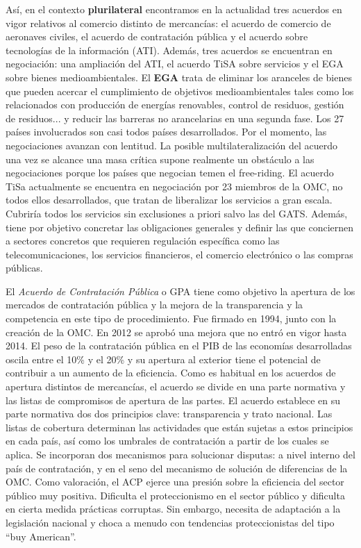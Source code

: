 \documentclass{nuevotema}
\begin{document}
Así, en el contexto \textbf{plurilateral} encontramos en la actualidad tres acuerdos en vigor relativos al comercio distinto de mercancías: el acuerdo de comercio de aeronaves civiles, el acuerdo de contratación pública y el acuerdo sobre tecnologías de la información (ATI). Además, tres acuerdos se encuentran en negociación: una ampliación del ATI, el acuerdo TiSA sobre servicios y el EGA sobre bienes medioambientales. El \textbf{EGA} trata de eliminar los aranceles de bienes que pueden acercar el cumplimiento de objetivos medioambientales tales como los relacionados con producción de energías renovables, control de residuos, gestión de residuos... y reducir las barreras no arancelarias en una segunda fase. Los 27 países involucrados son casi todos países desarrollados. Por el momento, las negociaciones avanzan con lentitud. La posible multilateralización del acuerdo una vez se alcance una masa crítica supone realmente un obstáculo a las negociaciones porque los países que negocian temen el free-riding. El acuerdo TiSa actualmente se encuentra en negociación por 23 miembros de la OMC, no todos ellos desarrollados, que tratan de liberalizar los servicios a gran escala. Cubriría todos los servicios sin exclusiones a priori salvo las del GATS. Además, tiene por objetivo concretar las obligaciones generales y definir las que conciernen a sectores concretos que requieren regulación específica como las telecomunicaciones, los servicios financieros, el comercio electrónico o las compras públicas. 

El \textit{Acuerdo de Contratación Pública} o GPA tiene como objetivo la apertura de los mercados de contratación pública y la mejora de la transparencia y la competencia en este tipo de procedimiento. Fue firmado en 1994, junto con la creación de la OMC. En 2012 se aprobó una mejora que no entró en vigor hasta 2014. El peso de la contratación pública en el PIB de las economías desarrolladas oscila entre el 10\% y el 20\% y su apertura al exterior tiene el potencial de contribuir a un aumento de la eficiencia. Como es habitual en los acuerdos de apertura distintos de mercancías, el acuerdo se divide en una parte normativa y las listas de compromisos de apertura de las partes. El acuerdo establece en su parte normativa dos dos principios clave: transparencia y trato nacional. Las listas de cobertura determinan las actividades que están sujetas a estos principios en cada país, así como los umbrales de contratación a partir de los cuales se aplica. Se incorporan dos mecanismos para solucionar disputas: a nivel interno del país de contratación, y en el seno del mecanismo de solución de diferencias de la OMC. Como valoración, el ACP ejerce una presión sobre la eficiencia del sector público muy positiva. Dificulta el proteccionismo en el sector público y dificulta en cierta medida prácticas corruptas. Sin embargo, necesita de adaptación a la legislación nacional y choca a menudo con tendencias proteccionistas del tipo ``buy American''. 
\end{document}
